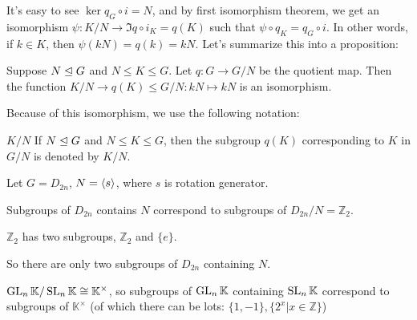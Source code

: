 It's easy to see $\ker q_G\circ i=N$, and by first isomorphism theorem, we get an isomorphism $\psi:K/N\to \Im q\circ i_K=q(K)$ such that $\psi\circ q_K = q_G\circ i$. In other words, if $k\in K$, then $\psi(kN)=q(k)=kN$. Let's summarize this into a proposition:

\begin{prop}
Suppose $N\trianglelefteq G$ and $N\le K\le G$. Let $q:G\to G/N$ be the quotient map. Then the function $K/N\to q(K)\le G/N:kN\mapsto kN$ is an isomorphism.
\end{prop}

Because of this isomorphism, we use the following notation:

\begin{notation}{$K/N$}
If $N\trianglelefteq G$ and $N\le K\le G$, then the subgroup $q(K)$ corresponding to $K$ in $G/N$ is denoted by $K/N$. 
\end{notation}

\begin{ex}[$D_{2n}$]
Let $G=D_{2n}$, $N=\left\langle s \right\rangle$, where $s$ is rotation generator.

Subgroups of $D_{2n}$ contains $N$ correspond to subgroups of $D_{2n}/N=\mathbb{Z}_2$.

$\mathbb{Z}_2$ has two subgroups, $\mathbb{Z}_2$ and $\{e\}$.

So there are only two subgroups of $D_{2n}$ containing $N$.
\end{ex}

\begin{ex}[$\gl_n \mathbb{K}$]
$\operatorname{GL}_n \mathbb{K}/\operatorname{SL}_n \mathbb{K}\cong \mathbb{K}^\times$, so subgroups of $\gl_n \mathbb{K}$ containing $\operatorname{SL}_n \mathbb{K}$ correspond to subgroups of $\mathbb{K}^\times$ (of which there can be lots: $\{1,-1\}, \{2^x| x\in \mathbb{Z}\}$)
\end{ex}
\printindex


 